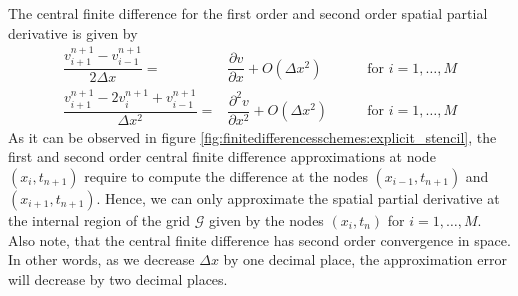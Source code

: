 The central finite difference for the first order and second order spatial partial derivative is given by
\begin{align}
  \label{eq:finitedifferencesschemes:explicit:spatial_first_order_central_finite_difference}
  \dfrac{v^{n+1}_{i+1} - v^{n+1}_{i-1}}{2 \Delta{x}} =& \dfrac{\partial{v}}{\partial{x}}+ O(\Delta{x}^2) \qquad & \text{for $i = 1, \dots, M$} \\
  \label{eq:finitedifferencesschemes:explicit:spatial_second_order_central_finite_difference}
  \dfrac{v^{n+1}_{i+1} - 2v^{n+1}_{i} + v^{n+1}_{i-1}}{\Delta{x}^2} =& \dfrac{\partial^2{v}}{\partial{x^2}}+ O(\Delta{x}^2) \qquad & \text{for $i = 1, \dots, M$}
\end{align}
As it can be observed in figure \eqref{fig:finitedifferencesschemes:explicit_stencil}, the first and second order central finite difference approximations at node $(x_i, t_{n+1})$ require to compute the difference at the nodes $(x_{i-1}, t_{n+1})$ and $(x_{i+1}, t_{n+1})$. Hence, we can only approximate the spatial partial derivative at the internal region of the grid $\mathcal{G}$ given by the nodes $(x_i, t_n)$ for $i=1,\dots,M$. Also note, that the central finite difference has second order convergence in space. In other words, as we decrease $\Delta{x}$ by one decimal place, the approximation error will decrease by two decimal places.

